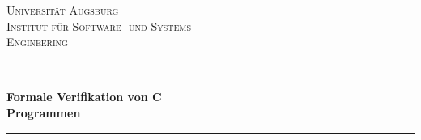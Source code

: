 \begin{titlepage} %
	\newcommand{\HRule}{\rule{\linewidth}{0.5mm}} %
	
	\center %
	
	
	\textsc{\LARGE Universität Augsburg}\\[1.5cm] %
	
	\textsc{\Large Institut für Software- und Systems\\[0.2cm] Engineering}\\[0.5cm] %
	
	
	
	\HRule\\[0.2cm]
	
	{\huge\bfseries Formale Verifikation von C\\[0.3cm] Programmen}\\[0.2cm] %
	
	\HRule\\[1.5cm]
	
	
	

\end{titlepage}
